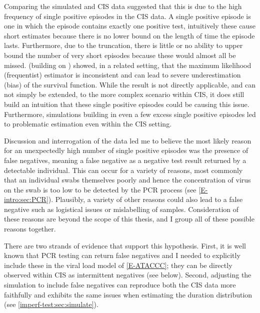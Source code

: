 \documentclass[thesis.tex]{subfiles}
\begin{document}
Comparing the simulated and CIS data suggested that this is due to the high frequency of single positive episodes in the CIS data.
A single positive episode is one in which the episode contains exactly one positive test, intuitively these cause short estimates because there is no lower bound on the length of time the episode lasts.
Furthermore, due to the truncation, there is little or no ability to upper bound the number of very short episodes because these would almost all be missed.
\Textcite{shenNonparametrica} (building on \textcite{panNote}) showed, in a related setting, that the maximum likelihood (frequentist) estimator is inconsistent and can lead to severe underestimation (bias) of the survival function.
While the result is not directly applicable, and can not simply be extended, to the more complex scenario within CIS, it does still build an intuition that these single positive episodes could be causing this issue.
Furthermore, simulations building in even a few excess single positive episodes led to problematic estimation even within the CIS setting.

Discussion and interrogation of the data led me to believe the most likely reason for an unexpectedly high number of single positive episodes was the presence of false negatives, meaning a false negative as a negative test result returned by a detectable individual.
This can occur for a variety of reasons, most commonly that an individual swabs themselves poorly and hence the concentration of virus on the swab is too low to be detected by the PCR process (see \cref{E-intro:sec:PCR}).
Plausibly, a variety of other reasons could also lead to a false negative such as logistical issues or mislabelling of samples.
Consideration of these reasons are beyond the scope of this thesis, and I group all of these possible reasons together.

There are two strands of evidence that support this hypothesis.
First, it is well known that PCR testing can return false negatives  and I needed to explicitly include these in the viral load model of \cref{E-ATACCC}; they can be directly observed within CIS as intermittent negatives (see below).
Second, adjusting the simulation to include false negatives can reproduce both the CIS data more faithfully and exhibits the same issues when estimating the duration distribution (see \cref{imperf-test:sec:simulate}).
\end{document}
